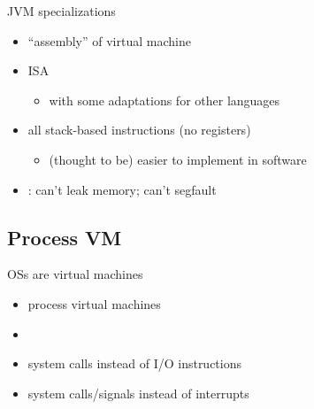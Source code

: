 \begin{frame}{JVM specializations}
    \begin{itemize}
    \item ``assembly'' of virtual machine \\ 
    \item ISA 
        \begin{itemize}
        \item with some adaptations for other languages
        \end{itemize}
    \item all stack-based instructions (no registers)
        \begin{itemize}
        \item (thought to be) easier to implement in software
        \end{itemize}
    \item {}: can't leak memory; can't segfault
    \end{itemize}
\end{frame}

\subsection{Process VM}


\begin{frame}{OSs are virtual machines}
    \begin{itemize}
    \item process virtual machines
    \item {}
    \item system calls instead of I/O instructions
    \item system calls/signals instead of interrupts
    \end{itemize}
\end{frame}

